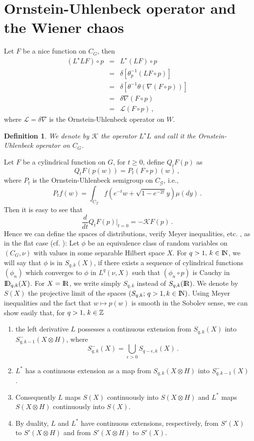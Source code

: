 \documentclass[12pt,a4paper]{book}
\newtheorem{definition}[theorem]{Definition}
\newcommand{\K}{{\mathcal K}}
\renewcommand{\L}{{\mathcal L}}
\newcommand{\G}{{\mathcal G}}
\newcommand{\Z}{{\Bbb Z}}
\newcommand{\DD}{{\rm I\!D}}
\newcommand{\R}{{\rm I\!R}}
\newcommand{\N}{{\rm I\!N}}
\begin{document}
\section{Ornstein-Uhlenbeck operator and the Wiener chaos}
Let $F$ be a nice function on $C_G$, then
\begin{eqnarray}
(L^\star L F)\circ p&=&L^\star (LF)\circ p\\
               &=&\delta\left[\theta_p^{-1}(LF\circ p)\right]\\
           &=&\delta\left[\theta^{-1}\theta(\nabla(F\circ p))\right]\\
          &=&\delta\nabla (F\circ p)\\
         &=&\L(F\circ p)\,,
\end{eqnarray}
where $\L=\delta\nabla$ is the Ornstein-Uhlenbeck operator on $W$.
\begin{definition}
We denote by $\K$ the operator $L^\star L$ and call it the Ornstein-Uhlenbeck
operator on $C_G$.
\end{definition}
Let $F$ be a cylindrical function on $G$, for $t\geq 0$, define $Q_tF(p)$ as
$$
Q_tF(p(w))=P_t(F\circ p)(w)\,,
$$
where $P_t$ is the Ornstein-Uhlenbeck semigroup on $C_\G$, i.e.,
$$
P_tf(w)=\int_{C_{\G}} f(e^{-t}w+\sqrt{1-e^{-2t}}y)\mu(dy)\,.
$$
Then it is easy to see that
$$
\frac{d}{dt}Q_tF(p)|_{t=0}=-\K F(p)\,.
$$
Hence we can define the spaces of distributions, verify Meyer inequalities,
etc. ,  as in the flat case (cf. \cite{P-U}): Let $\phi$ be an equivalence
class of random variables on $(C_G,\nu)$ with values in some separable Hilbert
space $X$. For $q>1,\,k\in \N$, we will say that
$\phi$ is in $S_{q,k}(X)$, if there exists a sequence of cylindrical functions
$(\phi_n)$ which converges to $\phi$ in $L^q(\nu,X)$ such that
$(\phi_n\circ p)$ is Cauchy in $\DD_{q,k}(X)$. For $X=\R$, we write simply
$S_{q,k}$ instead of $S_{q,k}(\R)$. We denote by $S(X)$ the projective limit of
the spaces $(S_{q,k};\,q>1,k\in \N)$. Using Meyer inequalities and the fact
that $w\mapsto p(w)$ is smooth in the Sobolev sense, we can show easily that,
for $q>1,\,k\in \Z$
\begin{enumerate}
\item the left derivative $L$ possesses a continuous extension from
  $S_{q,k}(X)$ into $S_{q,k-1}^-(X\otimes H)$, where
$$
S_{q,k}^-(X)=\bigcup_{\epsilon>0}S_{q-\epsilon,k}(X)\,.
$$
\item $L^*$ has a continuous extension as a map from $S_{q,k}(X\otimes H)$ into
  $S_{q,k-1}^-(X)$.
\item Consequently $L$ maps $S(X)$ continuously into $S(X\otimes H)$ and $L^*$
maps $S(X\otimes H)$ continuously into $S(X)$.
\item By duality, $L$ and $L^*$ have continuous extensions, respectively, from
  $S'(X)$ to $S'(X\otimes H)$ and from $S'(X\otimes H)$ to $S'(X)$.
\end{enumerate}
\end{document}
